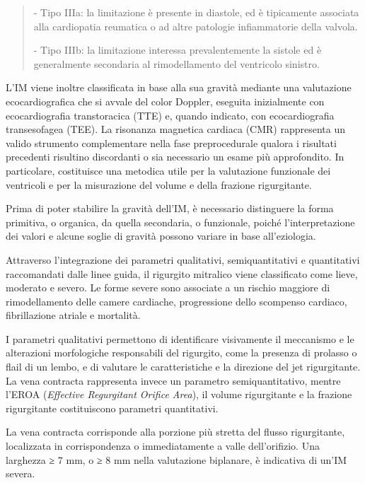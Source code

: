 \documentclass[12pt,a4paper,twoside]{article}
\begin{document}
\begin{quote}
- Tipo IIIa: la limitazione è presente in diastole, ed è tipicamente associata alla cardiopatia reumatica o ad altre patologie infiammatorie della valvola.

- Tipo IIIb: la limitazione interessa prevalentemente la sistole ed è generalmente secondaria al rimodellamento del ventricolo sinistro. \cite{ref6,ref9}
\end{quote}

L'IM viene inoltre classificata in base alla sua gravità mediante una valutazione ecocardiografica che si avvale del color Doppler, eseguita inizialmente con ecocardiografia transtoracica (TTE) e, quando indicato, con ecocardiografia transesofagea (TEE). La risonanza magnetica cardiaca (CMR) rappresenta un valido strumento complementare nella fase preprocedurale qualora i risultati precedenti risultino discordanti o sia necessario un esame più approfondito. In particolare, costituisce una metodica utile per la valutazione funzionale dei ventricoli e per la misurazione del volume e della frazione rigurgitante. \cite{ref6,ref9,ref10,ref11}

Prima di poter stabilire la gravità dell'IM, è necessario distinguere la forma primitiva, o organica, da quella secondaria, o funzionale, poiché l'interpretazione dei valori e alcune soglie di gravità possono variare in base all'eziologia. \cite{ref8,ref10}

Attraverso l'integrazione dei parametri qualitativi, semiquantitativi e quantitativi raccomandati dalle linee guida, il rigurgito mitralico viene classificato come lieve, moderato e severo. Le forme severe sono associate a un rischio maggiore di rimodellamento delle camere cardiache, progressione dello scompenso cardiaco, fibrillazione atriale e mortalità. \cite{ref6,ref9,ref10}

I parametri qualitativi permettono di identificare visivamente il meccanismo e le alterazioni morfologiche responsabili del rigurgito, come la presenza di prolasso o flail di un lembo, e di valutare le caratteristiche e la direzione del jet rigurgitante. La vena contracta rappresenta invece un parametro semiquantitativo, mentre l'EROA (\emph{Effective Regurgitant Orifice Area}), il volume rigurgitante e la frazione rigurgitante costituiscono parametri quantitativi. \cite{ref9}

La vena contracta corrisponde alla porzione più stretta del flusso rigurgitante, localizzata in corrispondenza o immediatamente a valle dell'orifizio. Una larghezza ≥ 7 mm, o ≥ 8 mm nella valutazione biplanare, è indicativa di un'IM severa. \cite{ref9,ref10}
\end{document}
